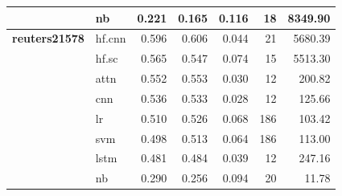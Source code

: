 \documentclass[final]{clv2025-revised}
\begin{document}
\begin{table}[h!]
{\begin{tabular}{@{}p{2cm}p{1.2cm}rrrrr@{}}
 & nb & 0.221 & 0.165 & 0.116 & 18 & 8349.90 \\
\midrule
\textbf{reuters21578} & hf.cnn & 0.596 & 0.606 & 0.044 & 21 & 5680.39 \\
 & hf.sc & 0.565 & 0.547 & 0.074 & 15 & 5513.30 \\
 & attn & 0.552 & 0.553 & 0.030 & 12 & 200.82 \\
 & cnn & 0.536 & 0.533 & 0.028 & 12 & 125.66 \\
 & lr & 0.510 & 0.526 & 0.068 & 186 & 103.42 \\
 & svm & 0.498 & 0.513 & 0.064 & 186 & 113.00 \\
 & lstm & 0.481 & 0.484 & 0.039 & 12 & 247.16 \\
 & nb & 0.290 & 0.256 & 0.094 & 20 & 11.78 \\
\bottomrule
\end{tabular}%
}
\end{table}
\end{document}
